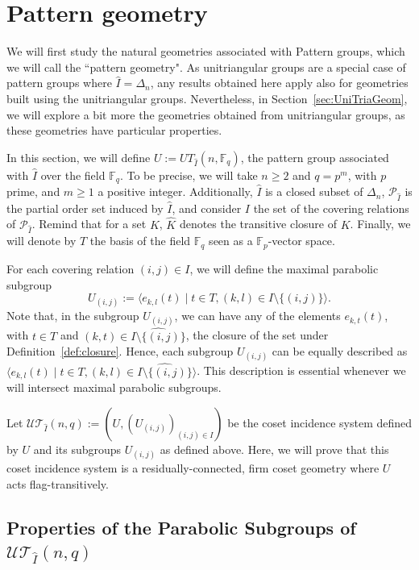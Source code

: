 \documentclass[11pt,letterpaper]{amsart}
\newcommand{\TT}{\mathcal{T}}
\newcommand{\PP}{\mathcal{P}}
\newcommand{\FF}{\mathbb{F}}
\newcommand{\UU}{\mathcal{U}}
\begin{document}
\section{Pattern geometry}\label{sec:PatternGeom}

We will first study the natural geometries associated with Pattern groups, which we will call the ``pattern geometry". As unitriangular groups are a special case of pattern groups where $\widehat{I} = \Delta_n$, any results obtained here apply also for geometries built using the unitriangular groups. Nevertheless, in Section~\ref{sec:UniTriaGeom}, we will explore a bit more the geometries obtained from unitriangular groups, as these geometries have particular properties.

In this section, we will define $U:= UT_{\widehat{I}}(n,\FF_q)$, the pattern group associated with $\widehat{I}$ over the field $\FF_q$. To be precise, we will take $n\geq 2$ and $q=p^m$, with $p$ prime, and $m\geq 1$ a positive integer.
Additionally, $\widehat{I}$ is a closed subset of $\Delta_n$, $\PP_{\widehat{I}}$ is the partial order set induced by $\widehat{I}$, and consider $I$ the set of the covering relations of $\PP_{\widehat{I}}$. Remind that for a set $K$, $\widehat{K}$ denotes the transitive closure of $K$.
Finally, we will denote by $T$ the basis of the field $\FF_q$ seen as a $\FF_p$-vector space.

For each covering relation $(i,j)\in I$, we will define the maximal parabolic subgroup 
$$U_{(i,j)}:=\langle e_{k,l}(t)\mid t\in T, (k,l)\in I\setminus\{(i,j)\}\rangle.$$
Note that, in the subgroup $U_{(i,j)}$, we can have any of the elements $e_{k,t}(t)$, with $t\in T$ and $(k,t)\in \widehat{I\setminus\{(i,j)\}}$, the closure of the set under Definition~\ref{def:closure}.
Hence, each subgroup $U_{(i,j)}$ can be equally described as $\langle e_{k,l}(t)\mid t\in T, (k,l)\in \widehat{I\setminus\{(i,j)\}}\rangle$. This description is essential whenever we will intersect maximal parabolic subgroups.


Let $\UU\TT_{\widehat{I}}(n,q):= (U,(U_{(i,j)})_{(i,j)\in I})$ be the coset incidence system defined by $U$ and its subgroups $U_{(i,j)}$ as defined above. Here, we will prove that this coset incidence system is a residually-connected, firm coset geometry where $U$ acts flag-transitively. 

\subsection{Properties of the Parabolic Subgroups of $\UU\TT_{\widehat{I}}(n,q)$}
\end{document}
